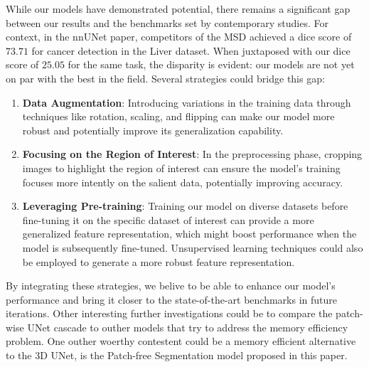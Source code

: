 While our models have demonstrated potential, there remains a significant gap between our results and the benchmarks set by contemporary studies.
For context, in the nnUNet paper, competitors of the MSD achieved a dice score of $73.71$ for cancer detection in the Liver dataset.
When juxtaposed with our dice score of $25.05$ for the same task, the disparity is evident: our models are not yet on par with the best in the field.
Several strategies could bridge this gap:
\begin{enumerate}
	\item \textbf{Data Augmentation}: Introducing variations in the training data through techniques like rotation, scaling, and flipping can make our model more robust and potentially improve its generalization capability.
	\item \textbf{Focusing on the Region of Interest}: In the preprocessing phase, cropping images to highlight the region of interest can ensure the model's training focuses more intently on the salient data, potentially improving accuracy.
	\item \textbf{Leveraging Pre-training}: Training our model on diverse datasets before fine-tuning it on the specific dataset of interest can provide a more generalized feature representation,
	which might boost performance when the model is subsequently fine-tuned. Unsupervised learning techniques could also be employed to generate a more robust feature representation.
\end{enumerate}
By integrating these strategies, we belive to be able to enhance our model's performance and bring it closer to the state-of-the-art benchmarks in future iterations.
Other interesting further investigations could be to compare the patch-wise UNet cascade to outher models that try to address the memory efficiency problem. One outher woerthy contestent could be a memory efficient alternative to the 3D UNet,
is the Patch-free Segmentation model proposed in this paper\cite{wang_super-resolution_2023}.